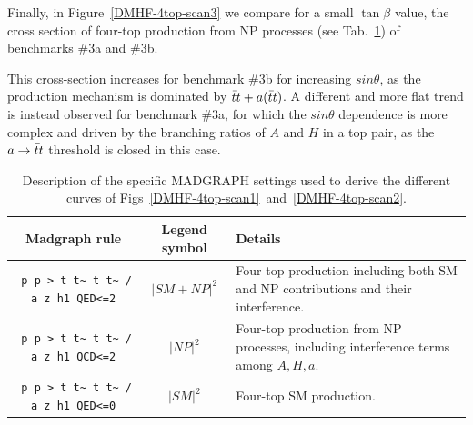 Finally, in Figure~\ref{DMHF-4top-scan3} we compare for a small $\tan\beta$ value, the cross section of four-top production from NP processes (see Tab.~\ref{tab-dmhf-4tops}) of benchmarks \#3a and \#3b. 

This cross-section increases for benchmark \#3b for increasing $sin\theta$, as the production mechanism is dominated by $\bar{t}t+a(\bar{t}t)$. 
A different and more flat trend is instead observed for benchmark \#3a, for which the $sin\theta$ dependence is more complex and driven by the branching ratios of $A$ and $H$ in a top pair, as the $a\rightarrow \bar{t}t$ threshold is closed in this case. 

\begin{table}
\begin{tabular}{ccm{50mm}}
\toprule
{\sc Madgraph} rule & Legend symbol & Details \\\midrule
\verb| p p > t t~ t t~ / a z h1 QED<=2|& $|SM+NP|^2$ & Four-top production including both SM and NP contributions and their interference. \\\midrule
\verb| p p > t t~ t t~ / a z h1 QCD<=2|& $|NP|^2$ & Four-top production from NP processes, including interference terms among
$A,H,a$. \\\midrule
\verb| p p > t t~ t t~ / a z h1 QED<=0|& $|SM|^2$ & Four-top SM production.\\
\bottomrule
\end{tabular}
\caption{Description of the specific MADGRAPH settings used to derive the different curves of Figs~\ref{DMHF-4top-scan1}~and~\ref{DMHF-4top-scan2}.}
\label{tab-dmhf-4tops}
\end{table}

